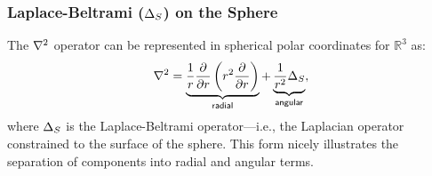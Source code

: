 \documentclass[11pt]{report}
\begin{document}
{%
%
%
%
%


\subsubsection{Laplace-Beltrami ($\LaplaceBeltrami$) on the Sphere}

The $\Laplacian$ operator can be represented in spherical polar coordinates for $\mathbb{R}^3$ as: 
\begin{align*} 
\nabla^2 = \underbrace{\frac{1}{r} \frac{\partial }{\partial r} \left( r^{2} \frac{\partial }{\partial r}  \right)}_{\mathsf{radial}} + \underbrace{\frac{1}{r^2} \Delta_{S}}_{\mathsf{angular}} , \label{eq:laplacian_in_spherical}
\end{align*}
where $\LaplaceBeltrami$ is the Laplace-Beltrami operator---i.e., the Laplacian operator constrained to the surface of the sphere. This form nicely illustrates the separation of components into radial and angular terms. 

}
\end{document}
